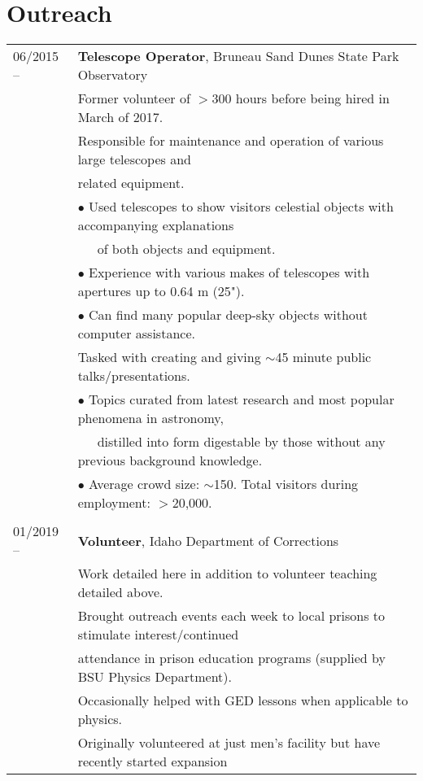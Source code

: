 \documentclass[11pt]{article}
\begin{document}
\section {Outreach}
\begin{tabular}{ll}
06/2015 --    &   \textbf{Telescope Operator}, Bruneau Sand Dunes State Park Observatory \\
      & Former volunteer of $>$300 hours before being hired in March of 2017.\vspace{1mm} \\
      & Responsible for maintenance and operation of various large telescopes and \\
      & related equipment.\\
      & $\bullet$ Used telescopes to show visitors celestial objects with accompanying explanations \\
      & \-\ \-\ \-\ of both objects and equipment.\\
      & $\bullet$ Experience with various makes of telescopes with apertures up to 0.64 m (25").\\
      & $\bullet$ Can find many popular deep-sky objects without computer assistance.\vspace{1mm} \\
      & Tasked with creating and giving $\sim$45 minute public talks/presentations.\\
      & $\bullet$ Topics curated from latest research and most popular phenomena in astronomy, \\
      & \-\ \-\ \-\ distilled into form digestable by those without any previous background knowledge.\\
      & $\bullet$ Average crowd size: $\sim$150. Total visitors during employment: $>$20,000.\\
      & \\
01/2019 --    &   \textbf{Volunteer}, Idaho Department of Corrections  \\
      & Work detailed here in addition to volunteer teaching detailed above. \vspace{1mm} \\
      & Brought outreach events each week to local prisons to stimulate interest/continued \\
      & attendance in prison education programs (supplied by BSU Physics Department). \\
      & Occasionally helped with GED lessons when applicable to physics.\\
      & Originally volunteered at just men's facility but have recently started expansion \\

\end{tabular}
\end{document}
